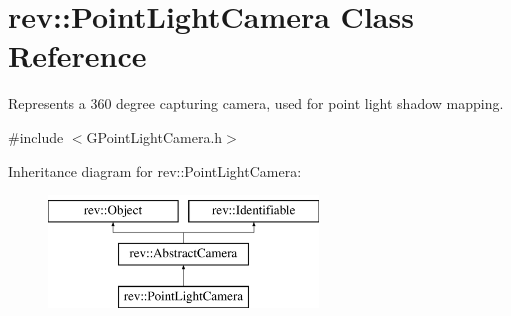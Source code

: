 \hypertarget{classrev_1_1_point_light_camera}{}\section{rev\+::Point\+Light\+Camera Class Reference}
\label{classrev_1_1_point_light_camera}


Represents a 360 degree capturing camera, used for point light shadow mapping.  




{\ttfamily \#include $<$G\+Point\+Light\+Camera.\+h$>$}

Inheritance diagram for rev\+::Point\+Light\+Camera\+:\begin{figure}[H]
\begin{center}
\leavevmode
\includegraphics[height=3.000000cm]{classrev_1_1_point_light_camera}
\end{center}
\end{figure}
